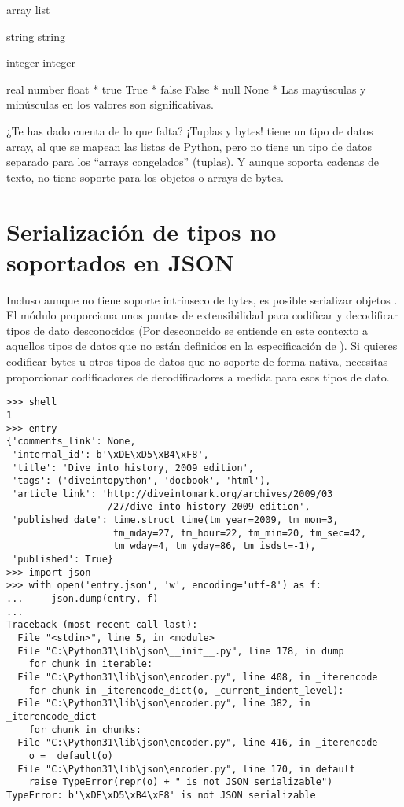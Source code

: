 array
list

string
string

integer
integer

real number
float
*
true
True
*
false
False
*
null
None
* Las mayúsculas y minúsculas en los valores  son significativas.

¿Te has dado cuenta de lo que falta? ¡Tuplas y bytes!  tiene un tipo de datos array, al que se mapean las listas de Python, pero no tiene un tipo de datos separado para los ``arrays congelados'' (tuplas). Y aunque  soporta cadenas de texto, no tiene soporte para los objetos  o arrays de bytes.

\section{Serialización de tipos no soportados en JSON}

Incluso aunque  no tiene soporte intrínseco de bytes, es posible serializar objetos . El módulo  proporciona unos puntos de extensibilidad para codificar y decodificar tipos de dato desconocidos (Por desconocido se entiende en este contexto a aquellos tipos de datos que no están definidos en la especificación de ). Si quieres codificar bytes u otros tipos de datos que  no soporte de forma nativa, necesitas proporcionar codificadores de decodificadores a medida para esos tipos de dato.

\noindent\begin{minipage}{\textwidth}
\begin{lstlisting}[mathescape=True]
>>> shell
1
>>> entry
{'comments_link': None,
 'internal_id': b'\xDE\xD5\xB4\xF8',
 'title': 'Dive into history, 2009 edition',
 'tags': ('diveintopython', 'docbook', 'html'),
 'article_link': 'http://diveintomark.org/archives/2009/03
                  /27/dive-into-history-2009-edition',
 'published_date': time.struct_time(tm_year=2009, tm_mon=3, 
                   tm_mday=27, tm_hour=22, tm_min=20, tm_sec=42, 
                   tm_wday=4, tm_yday=86, tm_isdst=-1),
 'published': True}
>>> import json
>>> with open('entry.json', 'w', encoding='utf-8') as f:
...     json.dump(entry, f)
... 
Traceback (most recent call last):
  File "<stdin>", line 5, in <module>
  File "C:\Python31\lib\json\__init__.py", line 178, in dump
    for chunk in iterable:
  File "C:\Python31\lib\json\encoder.py", line 408, in _iterencode
    for chunk in _iterencode_dict(o, _current_indent_level):
  File "C:\Python31\lib\json\encoder.py", line 382, in _iterencode_dict
    for chunk in chunks:
  File "C:\Python31\lib\json\encoder.py", line 416, in _iterencode
    o = _default(o)
  File "C:\Python31\lib\json\encoder.py", line 170, in default
    raise TypeError(repr(o) + " is not JSON serializable")
TypeError: b'\xDE\xD5\xB4\xF8' is not JSON serializable
\end{lstlisting}
\end{minipage}

